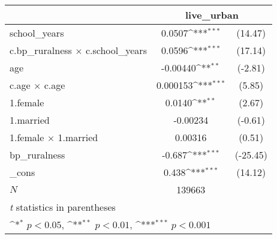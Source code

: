 \begin{table}[htbp]\centering
\def\sym#1{\ifmmode^{#1}\else\(^{#1}\)\fi}
\begin{tabular}{l*{1}{cc}}
\hline\hline
            &\multicolumn{2}{c}{live\_urban}    \\
\hline
school\_years&      0.0507\sym{***}&     (14.47)\\
c.bp\_ruralness $\times$ c.school\_years&      0.0596\sym{***}&     (17.14)\\
age         &    -0.00440\sym{**} &     (-2.81)\\
c.age $\times$ c.age &    0.000153\sym{***}&      (5.85)\\
1.female    &      0.0140\sym{**} &      (2.67)\\
1.married   &    -0.00234         &     (-0.61)\\
1.female $\times$ 1.married&     0.00316         &      (0.51)\\
bp\_ruralness&      -0.687\sym{***}&    (-25.45)\\
\_cons      &       0.438\sym{***}&     (14.12)\\
\hline
\(N\)       &      139663         &            \\
\hline\hline
\multicolumn{3}{l}{\footnotesize \textit{t} statistics in parentheses}\\
\multicolumn{3}{l}{\footnotesize \sym{*} \(p<0.05\), \sym{**} \(p<0.01\), \sym{***} \(p<0.001\)}\\
\end{tabular}
\end{table}
